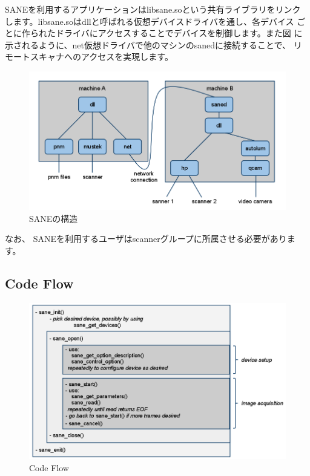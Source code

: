 \documentclass[mingoth,a4paper]{jsarticle}
\begin{document}
SANEを利用するアプリケーションはlibsane.soという共有ライブラリをリンク
します。libsane.soはdllと呼ばれる仮想デバイスドライバを通し、各デバイス
ごとに作られたドライバにアクセスすることでデバイスを制御します。また図
に示されるように、net仮想ドライバで他のマシンのsanedに接続することで、
リモートスキャナへのアクセスを実現します。
\cite{sane,sanejp,saneapi}

\begin{figure}[H]
\begin{center}
 \includegraphics[height=0.5\hsize] {image201012/libsane02.png}
 \caption{SANEの構造}
\label{fig:sane}
\end{center}
\end{figure}

なお、
SANEを利用するユーザはscannerグループに所属させる必要があります。

\newpage

\subsection{Code Flow}

\begin{figure}[H]
\begin{center}
 \includegraphics[height=0.5\hsize] {image201012/codeflow.png}
 \caption{Code Flow}
\label{fig:codeflow}
\end{center}
\end{figure}
\end{document}
